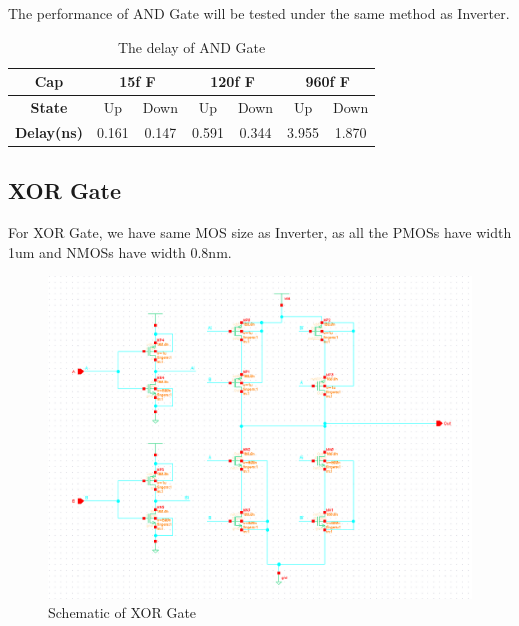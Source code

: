 \documentclass[conference]{IEEEtran}
\begin{document}
The performance of AND Gate will be tested under the same method as Inverter.

\begin{table}[h]
    \caption{The delay of AND Gate}
    \begin{center}
        \begin{tabular}{|c|c|c|c|c|c|c|}
            \hline
            \textbf{Cap} & \multicolumn{2}{|c|}{15f F} & \multicolumn{2}{|c|}{120f F} & \multicolumn{2}{|c|}{960f F} \\
            \hline
            \textbf{State} & Up & Down & Up & Down & Up & Down \\
            \hline
            
            \textbf{Delay(ns)} & 0.161  & 0.147 & 0.591 & 0.344 & 3.955 & 1.870 \\
            \hline
        \end{tabular}
    \end{center}
    \label{The delay of AND}
\end{table}

\subsection{XOR Gate}

For XOR Gate, we have same MOS size as Inverter, as all the PMOSs have width 1um and NMOSs have width 0.8nm.

\begin{figure}[H]
    \centering
    \includegraphics[width = 0.9\linewidth]{xor2_schematic.png}
    \caption{Schematic of XOR Gate}
    \label{Schematic of XOR Gate}
\end{figure}
\end{document}
